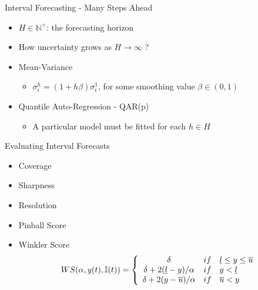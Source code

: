 \documentclass{beamer}
\begin{document}

\begin{frame}{Interval Forecasting - Many Steps Ahead}
\linespread{2}
\begin{itemize}
\item $H \in \mathbb{N}^+$: the forecasting horizon
\item How uncertainty grows as $H \rightarrow \infty$ ?
\item Mean-Variance
\begin{itemize}
\item $\sigma_\epsilon^h = (1 + h\beta)\sigma_\epsilon^1$, for some smoothing value $\beta \in (0,1)$
\end{itemize}
\item Quantile Auto-Regression - QAR(p)
\begin{itemize}
\item A particular model must be fitted for each $h \in H$
\end{itemize}
\end{itemize}
\end{frame}

\note[itemize]{
\item 
}


\begin{frame}{Evaluating Interval Forecasts}
\linespread{2}
\begin{itemize}
\item Coverage
\item Sharpness
\item Resolution
\item Pinball Score
\item Winkler Score
$$
WS(\alpha, y(t), \mathbb{I}(t)) = \left\{ \begin{array}{ccl}
\delta & if & \underline{l} \leq y \leq \overline{u} \\
\delta + 2(\underline{l} - y)/\alpha & if & y < \underline{l}  \\
\delta + 2(y - \overline{u})/\alpha & if & \overline{u} < y   
\end{array} \right.
$$
\end{itemize}
\end{frame}
\end{document}

